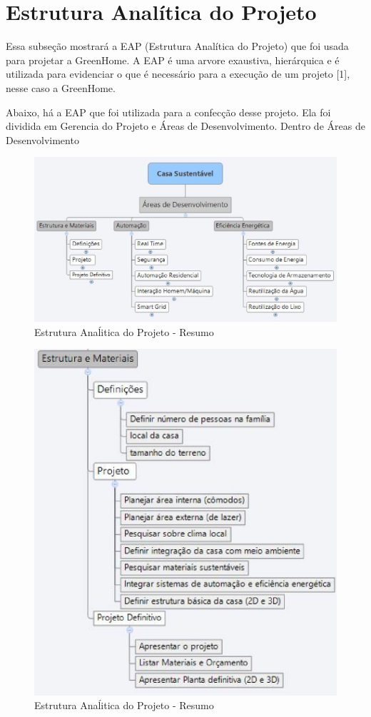 \section{Estrutura Analítica do Projeto}

Essa subseção mostrará a EAP (Estrutura Analítica do Projeto) que foi usada para projetar a GreenHome. A EAP é uma arvore exaustiva, hierárquica e é utilizada para evidenciar o que é necessário para a execução de um projeto [1], nesse caso a GreenHome.

Abaixo, há a EAP que foi utilizada para a confecção desse projeto. Ela foi dividida em Gerencia do Projeto e Áreas de Desenvolvimento. Dentro de Áreas de Desenvolvimento

\begin{figure}[H]
\centering
\includegraphics[keepaspectratio,scale=0.6]{figuras/EAP_resumo.eps}
\caption{Estrutura Anaĺitica do Projeto - Resumo}
\end{figure}

\begin{figure}[H]
\centering
\includegraphics[keepaspectratio,scale=0.6]{figuras/EAP_estrutura.eps}
\caption{Estrutura Anaĺitica do Projeto - Resumo}
\end{figure}

